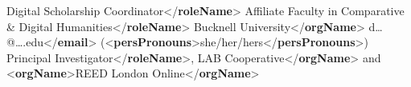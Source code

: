 \begin{shaded}
\hspace*{1em}Digital Scholarship Coordinator{</\textbf{roleName}>}\mbox{}\newline 
\hspace*{1em}\mbox{}\newline 
\hspace*{1em}Affiliate Faculty in Comparative \& Digital Humanities{</\textbf{roleName}>}\mbox{}\newline 
\hspace*{1em}\mbox{}\newline 
\hspace*{1em}Bucknell University{</\textbf{orgName}>}\mbox{}\newline 
\hspace*{1em}\mbox{}\newline 
\hspace*{1em}d…@….edu{</\textbf{email}>}\mbox{}\newline 
\hspace*{1em}({<\textbf{persPronouns}>}she/her/hers{</\textbf{persPronouns}>})\mbox{}\newline 
{}\mbox{}\newline 
\hspace*{1em}\mbox{}\newline 
\hspace*{1em}Principal Investigator{</\textbf{roleName}>},\mbox{}\newline 
{}\mbox{}\newline 
\hspace*{1em}LAB Cooperative{</\textbf{orgName}>} and {<\textbf{orgName}>}REED London Online{</\textbf{orgName}>}\mbox{}\newline 

\end{shaded}
